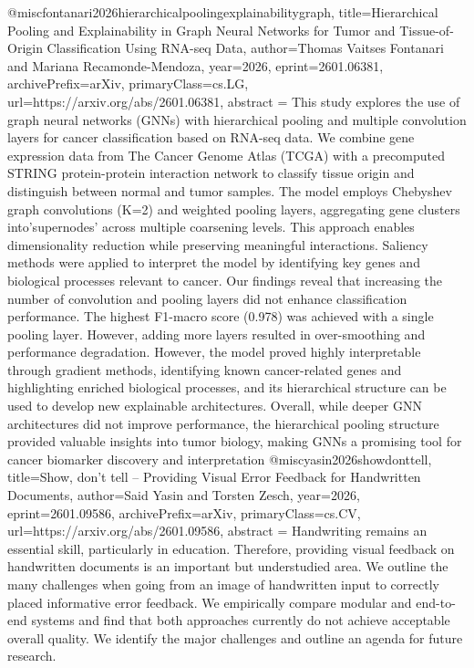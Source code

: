 {}@misc{fontanari2026hierarchicalpoolingexplainabilitygraph,
      title={Hierarchical Pooling and Explainability in Graph Neural Networks for Tumor and Tissue-of-Origin Classification Using RNA-seq Data}, 
      author={Thomas Vaitses Fontanari and Mariana Recamonde-Mendoza},
      year={2026},
      eprint={2601.06381},
      archivePrefix={arXiv},
      primaryClass={cs.LG},
      url={https://arxiv.org/abs/2601.06381},
      abstract = {This study explores the use of graph neural networks (GNNs) with hierarchical pooling and multiple convolution layers for cancer classification based on RNA-seq data. We combine gene expression data from The Cancer Genome Atlas (TCGA) with a precomputed STRING protein-protein interaction network to classify tissue origin and distinguish between normal and tumor samples. The model employs Chebyshev graph convolutions (K=2) and weighted pooling layers, aggregating gene clusters into'supernodes' across multiple coarsening levels. This approach enables dimensionality reduction while preserving meaningful interactions. Saliency methods were applied to interpret the model by identifying key genes and biological processes relevant to cancer. Our findings reveal that increasing the number of convolution and pooling layers did not enhance classification performance. The highest F1-macro score (0.978) was achieved with a single pooling layer. However, adding more layers resulted in over-smoothing and performance degradation. However, the model proved highly interpretable through gradient methods, identifying known cancer-related genes and highlighting enriched biological processes, and its hierarchical structure can be used to develop new explainable architectures. Overall, while deeper GNN architectures did not improve performance, the hierarchical pooling structure provided valuable insights into tumor biology, making GNNs a promising tool for cancer biomarker discovery and interpretation}
}@misc{yasin2026showdonttell,
      title={Show, don't tell -- Providing Visual Error Feedback for Handwritten Documents}, 
      author={Said Yasin and Torsten Zesch},
      year={2026},
      eprint={2601.09586},
      archivePrefix={arXiv},
      primaryClass={cs.CV},
      url={https://arxiv.org/abs/2601.09586},
      abstract = {Handwriting remains an essential skill, particularly in education. Therefore, providing visual feedback on handwritten documents is an important but understudied area. We outline the many challenges when going from an image of handwritten input to correctly placed informative error feedback. We empirically compare modular and end-to-end systems and find that both approaches currently do not achieve acceptable overall quality. We identify the major challenges and outline an agenda for future research.}
}
